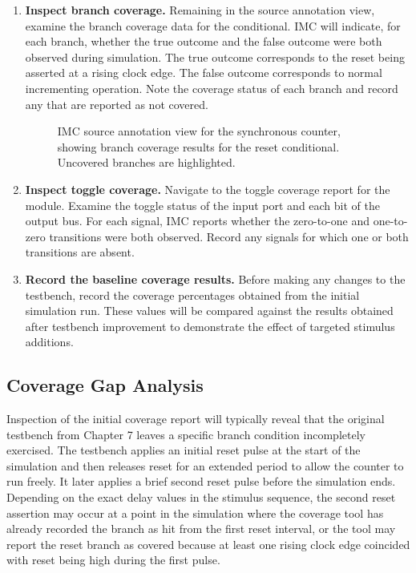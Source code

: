 \begin{enumerate}
\item \textbf{Inspect branch coverage.} Remaining in the source annotation view, examine the branch coverage data for the  conditional. IMC will indicate, for each branch, whether the true outcome and the false outcome were both observed during simulation. The true outcome corresponds to the reset being asserted at a rising clock edge. The false outcome corresponds to normal incrementing operation. Note the coverage status of each branch and record any that are reported as not covered.

\begin{figure}[H]
\centering
\caption{IMC source annotation view for the synchronous counter, showing branch coverage results for the reset conditional. Uncovered branches are highlighted.}
\end{figure}

\item \textbf{Inspect toggle coverage.} Navigate to the toggle coverage report for the  module. Examine the toggle status of the  input port and each bit of the  output bus. For each signal, IMC reports whether the zero-to-one and one-to-zero transitions were both observed. Record any signals for which one or both transitions are absent.

\item \textbf{Record the baseline coverage results.} Before making any changes to the testbench, record the coverage percentages obtained from the initial simulation run. These values will be compared against the results obtained after testbench improvement to demonstrate the effect of targeted stimulus additions.

\end{enumerate}

\subsection{Coverage Gap Analysis}

Inspection of the initial coverage report will typically reveal that the original testbench from Chapter 7 leaves a specific branch condition incompletely exercised. The testbench applies an initial reset pulse at the start of the simulation and then releases reset for an extended period to allow the counter to run freely. It later applies a brief second reset pulse before the simulation ends. Depending on the exact delay values in the stimulus sequence, the second reset assertion may occur at a point in the simulation where the coverage tool has already recorded the branch as hit from the first reset interval, or the tool may report the reset branch as covered because at least one rising clock edge coincided with reset being high during the first pulse.\

